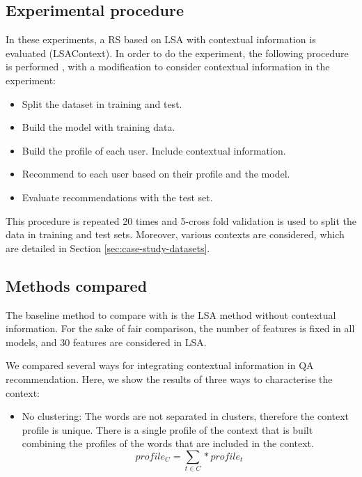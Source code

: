 \documentclass[preprint]{elsarticle}
\begin{document}
\begin{spacing}{1.5}
\subsection{Experimental procedure}

In these experiments, a RS based on LSA with contextual information is evaluated (LSAContext). In order to do the experiment, the following procedure is performed \cite{Sarwar2001}, with a modification to consider contextual information in the experiment:
\begin{itemize}
	\item Split the dataset in training and test.
	\item Build the model with training data.
	\item Build the profile of each user. Include contextual information.
	\item Recommend to each user based on their profile and the model.
	\item Evaluate recommendations with the test set.
\end{itemize}

This procedure is repeated 20 times and 5-cross fold validation is used to split the data in training and test sets. Moreover, various contexts are considered, which are detailed in Section \ref{sec:case-study-datasets}.

\subsection{Methods compared}


The baseline method to compare with is the LSA method without contextual information. For the sake of fair comparison, the number of features is fixed in all models, and 30 features are considered in LSA.

We compared several ways for integrating contextual information in QA recommendation. Here, we show the results of three ways to characterise the context:

\begin{itemize}

	\item No clustering: The words are not separated in clusters, therefore the context profile is unique. There is a single profile of the context that is built combining the profiles of the words that are included in the context.
	\begin{equation}
		profile_{C} = \sum_{t \in C} * profile_t
	\end{equation}


\end{itemize}
\end{spacing}
\end{document}
